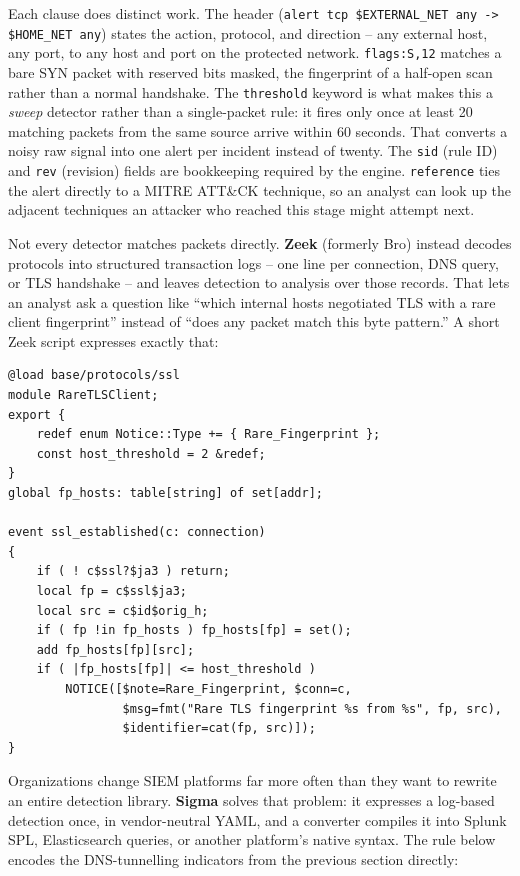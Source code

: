Each clause does distinct work. The header (\texttt{alert tcp \$EXTERNAL\_NET any ->
\$HOME\_NET any}) states the action, protocol, and direction -- any external host, any port, to any
host and port on the protected network. \texttt{flags:S,12} matches a bare SYN packet with reserved
bits masked, the fingerprint of a half-open scan rather than a normal handshake. The
\texttt{threshold} keyword is what makes this a \emph{sweep} detector rather than a single-packet
rule: it fires only once at least 20 matching packets from the same source arrive within 60
seconds. That converts a noisy raw signal into one alert per incident instead of twenty. The
\texttt{sid} (rule ID) and \texttt{rev} (revision) fields are bookkeeping required by the engine.
\texttt{reference} ties the alert directly to a MITRE ATT\&CK technique, so an analyst can look
up the adjacent techniques an attacker who reached this stage might attempt next.

Not every detector matches packets directly. \textbf{Zeek} (formerly Bro) instead decodes protocols
into structured transaction logs -- one line per connection, DNS query, or TLS handshake -- and
leaves detection to analysis over those records. That lets an analyst ask a question like ``which
internal hosts negotiated TLS with a rare client fingerprint'' instead of ``does any packet match
this byte pattern.'' A short Zeek script expresses exactly that:

\begin{lstlisting}[caption={A Zeek script flagging rare TLS client fingerprints}]
@load base/protocols/ssl
module RareTLSClient;
export {
    redef enum Notice::Type += { Rare_Fingerprint };
    const host_threshold = 2 &redef;
}
global fp_hosts: table[string] of set[addr];

event ssl_established(c: connection)
{
    if ( ! c$ssl?$ja3 ) return;
    local fp = c$ssl$ja3;
    local src = c$id$orig_h;
    if ( fp !in fp_hosts ) fp_hosts[fp] = set();
    add fp_hosts[fp][src];
    if ( |fp_hosts[fp]| <= host_threshold )
        NOTICE([$note=Rare_Fingerprint, $conn=c,
                $msg=fmt("Rare TLS fingerprint %s from %s", fp, src),
                $identifier=cat(fp, src)]);
}
\end{lstlisting}

Organizations change SIEM platforms far more often than they want to rewrite an entire detection
library. \textbf{Sigma} solves that problem: it expresses a log-based detection once, in
vendor-neutral YAML, and a converter compiles it into Splunk SPL, Elasticsearch queries, or another
platform's native syntax. The rule below encodes the DNS-tunnelling indicators from the previous
section directly:

